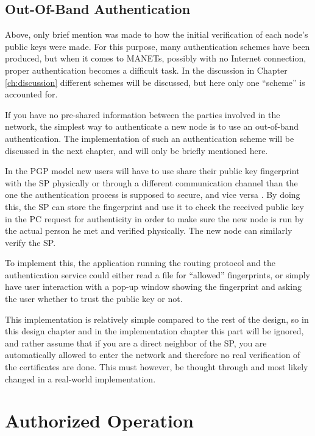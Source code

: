 \subsection{Out-Of-Band Authentication}
Above, only brief mention was made to how the initial verification of each
node's public keys were made. For this purpose, many authentication schemes
have been produced, but when it comes to \acp{MANET}, possibly with no Internet
connection, proper authentication becomes a difficult task. In the discussion
in Chapter \ref{ch:discussion} different schemes will be discussed, but here
only one ``scheme'' is accounted for.

If you have no pre-shared information between the parties involved in the
network, the simplest way to authenticate a new node is to use an out-of-band
authentication. The implementation of such an authentication scheme will be
discussed in the next chapter, and will only be briefly mentioned here.

In the PGP model new users will have to use share their public key fingerprint
with the \ac{SP} physically or through a different communication channel than
the one the authentication process is supposed to secure, and vice versa
\cite{zimmermann1995official}. By doing this, the \ac{SP} can store the
fingerprint and use it to check the received public key in the \ac{PC} request
for authenticity in order to make sure the new node is run by the actual person
he met and verified physically. The new node can similarly verify the \ac{SP}.

To implement this, the application running the routing protocol and the
authentication service could either read a file for ``allowed'' fingerprints, or
simply have user interaction with a pop-up window showing the fingerprint and
asking the user whether to trust the public key or not.

This implementation is relatively simple compared to the rest of the design, so
in this design chapter and in the implementation chapter this part will be
ignored, and rather assume that if you are a direct neighbor of the \ac{SP}, you
are automatically allowed to enter the network and therefore no real
verification of the certificates are done. This must however, be thought through
and most likely changed in a real-world implementation.

\section{Authorized Operation}

